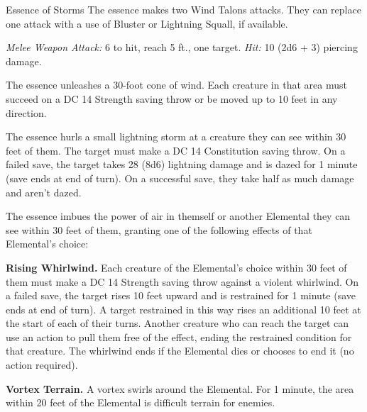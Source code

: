 \documentclass[10pt,a4paper,twoside,bg=print,twocolumn,openany,nodeprecatedcode]{dndbook}
\begin{document}
\begin{DndMonster}[float=t]{Essence of Storms}
\DndMonsterBasics[
armor-class = {14 (natural armor)},
hit-points = {\DndDice{12d8 + 24}},
speed = {20 ft., fly 60 ft. \textit{(hover)}}
]
\DndMonsterAbilityScores[
 str = 12,
 dex = 17,
 con = 14,
 int = 9,
 wis = 11,
 cha = 13
]
\DndMonsterDetails[
skills = {Acrobatics +6, Perception +6},
damage-resistances = {lightning, poison, thunder},
condition-immunities = {dazed, grappled, paralyzed, poisoned, restrained},
senses = {darkvision 60 ft., passive perception 16},
languages = {Auran, Common},
challenge = 5,
]
The essence makes two Wind Talons attacks. They can replace one attack with a use of Bluster or Lightning Squall, if available.

\textsl{Melee Weapon Attack:} 6 to hit, reach 5 ft., one target. \textsl{Hit:} 10 (2d6 + 3) piercing damage.

The essence unleashes a 30-foot cone of wind. Each creature in that area must succeed on a DC 14 Strength saving throw or be moved up to 10 feet in any direction.

The essence hurls a small lightning storm at a creature they can see within 30 feet of them. The target must make a DC 14 Constitution saving throw. On a failed save, the target takes 28 (8d6) lightning damage and is dazed for 1 minute (save ends at end of turn). On a successful save, they take half as much damage and aren't dazed.

The essence imbues the power of air in themself or another Elemental they can see within 30 feet of them, granting one of the following effects of that Elemental's choice:


\begin{description}
\item \textbf{Rising Whirlwind.} Each creature of the Elemental's choice within 30 feet of them must make a DC 14 Strength saving throw against a violent whirlwind. On a failed save, the target rises 10 feet upward and is restrained for 1 minute (save ends at end of turn). A target restrained in this way rises an additional 10 feet at the start of each of their turns. Another creature who can reach the target can use an action to pull them free of the effect, ending the restrained condition for that creature. The whirlwind ends if the Elemental dies or chooses to end it (no action required).
\item \textbf{Vortex Terrain.} A vortex swirls around the Elemental. For 1 minute, the area within 20 feet of the Elemental is difficult terrain for enemies.
\end{description}

\end{DndMonster}
\end{document}
